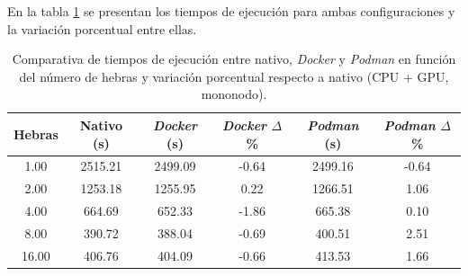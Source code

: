 En la tabla \ref{tab:single-node_ubuntu_container_vs_native_gpu} se presentan los tiempos de ejecución para ambas configuraciones y la variación porcentual entre ellas.

\begin{table}[ht]
    \centering
    \small
    \setlength{\tabcolsep}{4pt}
    \renewcommand{\arraystretch}{1.1}
    \begin{tabular}{|c|c|c|c|c|c|}
        \hline
        \textbf{Hebras} & \textbf{Nativo (s)} & \textbf{\textit{Docker} (s)} & \textbf{\textit{Docker} $\Delta$\%} & \textbf{\textit{Podman} (s)} & \textbf{\textit{Podman} $\Delta$\%} \\
        \hline
        1.00            & 2515.21             & 2499.09                      & -0.64                               & 2499.16                      & -0.64                               \\
        2.00            & 1253.18             & 1255.95                      & 0.22                                & 1266.51                      & 1.06                                \\
        4.00            & 664.69              & 652.33                       & -1.86                               & 665.38                       & 0.10                                \\
        8.00            & 390.72              & 388.04                       & -0.69                               & 400.51                       & 2.51                                \\
        16.00           & 406.76              & 404.09                       & -0.66                               & 413.53                       & 1.66                                \\
        \hline
    \end{tabular}
    \caption{Comparativa de tiempos de ejecución entre nativo, \textit{Docker} y \textit{Podman} en función del número de hebras y variación porcentual respecto a nativo (CPU + GPU, mononodo).}
    \label{tab:single-node_ubuntu_container_vs_native_gpu}
\end{table}

